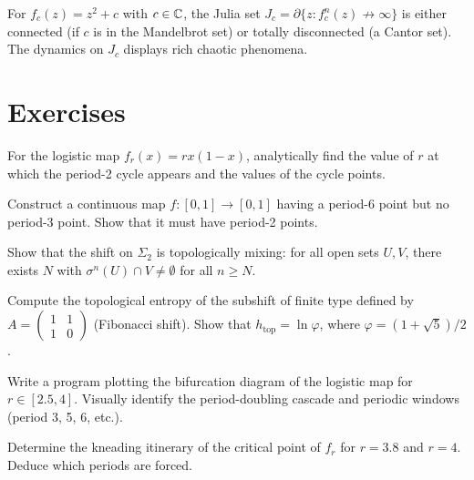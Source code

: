 \begin{example}
For $f_c(z) = z^2 + c$ with $c \in \mathbb{C}$, the Julia set
$J_c = \partial\{z : f_c^n(z) \not\to \infty\}$ is either connected (if $c$
is in the Mandelbrot set) or totally disconnected (a Cantor set). The
dynamics on $J_c$ displays rich chaotic phenomena.
\end{example}

\section{Exercises}

\begin{exercise}
For the logistic map $f_r(x) = rx(1-x)$, analytically find the value of $r$
at which the period-2 cycle appears and the values of the cycle points.
\end{exercise}

\begin{exercise}[Sharkovskii]
Construct a continuous map $f : [0,1] \to [0,1]$ having a period-6 point but
no period-3 point. Show that it must have period-2 points.
\end{exercise}

\begin{exercise}
Show that the shift on $\Sigma_2$ is topologically mixing: for all open sets
$U, V$, there exists $N$ with $\sigma^n(U) \cap V \neq \emptyset$ for all
$n \geq N$.
\end{exercise}

\begin{exercise}[Entropy]
Compute the topological entropy of the subshift of finite type defined by
$A = \begin{pmatrix} 1 & 1 \\ 1 & 0 \end{pmatrix}$ (Fibonacci shift). Show
that $h_{\mathrm{top}} = \ln\varphi$, where $\varphi = (1+\sqrt{5})/2$.
\end{exercise}

\begin{exercise}
Write a program plotting the bifurcation diagram of the logistic map for
$r \in [2.5, 4]$. Visually identify the period-doubling cascade and periodic
windows (period 3, 5, 6, etc.).
\end{exercise}

\begin{exercise}
Determine the kneading itinerary of the critical point of $f_r$ for $r = 3.8$
and $r = 4$. Deduce which periods are forced.
\end{exercise}
